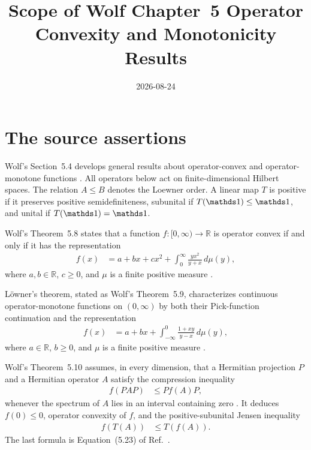 \documentclass{article}
\title{Scope of Wolf Chapter~5 Operator Convexity and Monotonicity Results}
\author{}
\date{2026-08-24}
\begin{document}
\maketitle
{}

\section{The source assertions}

Wolf's Section~5.4 develops general results about operator-convex and
operator-monotone functions \cite[Section~5.4]{Wolf2012Quantum}. All operators
below act on finite-dimensional Hilbert spaces. The relation $A\leq B$ denotes
the Loewner order. A linear map $T$ is positive if it preserves positive
semidefiniteness, subunital if $T(\Id)\leq\Id$, and unital if
$T(\Id)=\Id$.

Wolf's Theorem~5.8 states that a function
$f\colon[0,\infty)\to\mathbb R$ is operator convex if and only if it has the
representation
\begin{align}
    f(x)
        &=a+bx+cx^2
          +\int_0^\infty\frac{yx^2}{y+x}\,d\mu(y),
    \label{eq:wolf_ch5_operator_convexity_scope_operator_convex_representation}
\end{align}
where $a,b\in\mathbb R$, $c\geq 0$, and $\mu$ is a finite positive measure
\cite[Theorem~5.8, Equation~(5.18)]{Wolf2012Quantum}.

L\"owner's theorem, stated as Wolf's Theorem~5.9, characterizes continuous
operator-monotone functions on $(0,\infty)$ by both their Pick-function
continuation and the representation
\begin{align}
    f(x)
        &=a+bx
          +\int_{-\infty}^0\frac{1+xy}{y-x}\,d\mu(y),
    \label{eq:wolf_ch5_operator_convexity_scope_operator_monotone_representation}
\end{align}
where $a\in\mathbb R$, $b\geq 0$, and $\mu$ is a finite positive measure
\cite[Theorem~5.9, Equation~(5.19)]{Wolf2012Quantum}.

Wolf's Theorem~5.10 assumes, in every dimension, that a Hermitian projection
$P$ and a Hermitian operator $A$ satisfy the compression inequality
\begin{align}
    f(PAP)&\leq Pf(A)P,
    \label{eq:wolf_ch5_operator_convexity_scope_source_projection_assumption}
\end{align}
whenever the spectrum of $A$ lies in an interval containing zero
\cite[Theorem~5.10, Equation~(5.22)]{Wolf2012Quantum}. It deduces
$f(0)\leq 0$, operator convexity of $f$, and the positive-subunital Jensen
inequality
\begin{align}
    f(T(A))&\leq T(f(A)).
    \label{eq:wolf_ch5_operator_convexity_scope_source_subunital_jensen}
\end{align}
The last formula is Equation~(5.23) of
Ref.~\cite{Wolf2012Quantum}.
\end{document}
